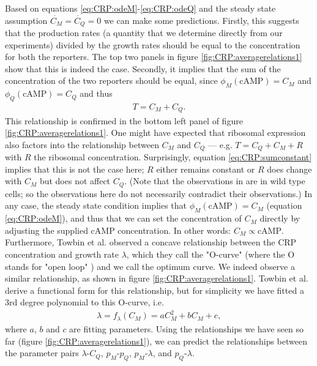 %
Based on equations \ref{eq:CRP:odeM}-\ref{eq:CRP:odeQ} and the steady state assumption $\dot{C_M}=\dot{C_Q}=0$ we can make some predictions. Firstly, this suggests that the production rates (a quantity that we determine directly from our experiments) divided by the growth rates should be equal to the concentration for both the reporters. The top two panels in figure \ref{fig:CRP:averagerelations1} show that this is indeed the case. Secondly, it implies that the sum of the concentration of the two reporters should be equal, since $\phi_M(\text{cAMP}) = C_M$ and $\phi_Q(\text{cAMP}) = C_Q$ and thus 
\begin{align}
	\label{eq:CRP:sumconstant}	
	T = C_M + C_Q
	.
\end{align}
This relationship is confirmed in the bottom left panel of figure \ref{fig:CRP:averagerelations1}. 
One might have expected that ribosomal expression also factors into the relationship between $C_M$ and $C_Q$ --- e.g. $T=C_Q+C_M+R$ with $R$ the ribosomal concentration.
Surprisingly, equation \ref{eq:CRP:sumconstant} implies that this is not the case here; $R$ either remains constant or $R$ does change with $C_M$ but does not affect $C_Q$.
%
(Note that the observations in \cite{You2013} are in wild type cells; so the observations here do not necessarily contradict their observations.)
%
In any case, the steady state condition implies that $\phi_M(\text{cAMP}) = C_M$ (equation \ref{eq:CRP:odeM}), and thus that we can set the concentration of $C_M$ directly by adjusting the supplied cAMP concentration.
In other words: $C_M \propto \text{cAMP}$.
Furthermore, Towbin et al. observed a concave relationship between the CRP concentration and growth rate $\lambda$, which they call the "O-curve" (where the O stands for "open loop" \cite{Towbin2017}) and we call the optimum curve.
We indeed observe a similar relationship, as shown in figure \ref{fig:CRP:averagerelations1}. 
Towbin et al. derive a functional form for this relationship, but for simplicity we have fitted a 3rd degree polynomial to this O-curve, i.e.
\begin{align}
	\label{eq:CRP:muwithCRP}	
	\lambda = f_\lambda(C_M) = a C_M^2 + b C_M + c
	,
\end{align}
where $a$, $b$ and $c$ are fitting parameters.
%
Using the relationships we have seen so far (figure \ref{fig:CRP:averagerelations1}), 
we can predict the relationships between the parameter pairs 
$\lambda\text{-}C_Q$, $p_M\text{-}p_Q$, $p_M\text{-}\lambda$, and $p_Q\text{-}\lambda$.
